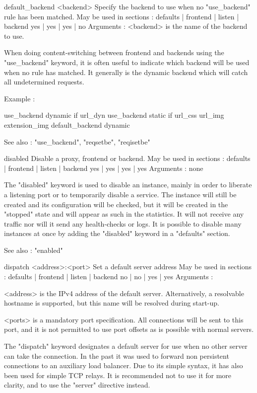 default_backend <backend>
  Specify the backend to use when no "use_backend" rule has been matched.
  May be used in sections :   defaults | frontend | listen | backend
                                 yes   |    yes   |   yes  |   no
  Arguments :
    <backend> is the name of the backend to use.

  When doing content-switching between frontend and backends using the
  "use_backend" keyword, it is often useful to indicate which backend will be
  used when no rule has matched. It generally is the dynamic backend which
  will catch all undetermined requests.

  Example :

        use_backend     dynamic  if  url_dyn
        use_backend     static   if  url_css url_img extension_img
        default_backend dynamic

  See also : "use_backend", "reqsetbe", "reqisetbe"


disabled
  Disable a proxy, frontend or backend.
  May be used in sections :   defaults | frontend | listen | backend
                                 yes   |    yes   |   yes  |   yes
  Arguments : none

  The "disabled" keyword is used to disable an instance, mainly in order to
  liberate a listening port or to temporarily disable a service. The instance
  will still be created and its configuration will be checked, but it will be
  created in the "stopped" state and will appear as such in the statistics. It
  will not receive any traffic nor will it send any health-checks or logs. It
  is possible to disable many instances at once by adding the "disabled"
  keyword in a "defaults" section.

  See also : "enabled"


dispatch <address>:<port>
  Set a default server address
  May be used in sections :   defaults | frontend | listen | backend
                                 no    |    no    |   yes  |   yes
  Arguments :

    <address> is the IPv4 address of the default server. Alternatively, a
              resolvable hostname is supported, but this name will be resolved
              during start-up.

    <ports>   is a mandatory port specification. All connections will be sent
              to this port, and it is not permitted to use port offsets as is
              possible with normal servers.

  The "dispatch" keyword designates a default server for use when no other
  server can take the connection. In the past it was used to forward non
  persistent connections to an auxiliary load balancer. Due to its simple
  syntax, it has also been used for simple TCP relays. It is recommended not to
  use it for more clarity, and to use the "server" directive instead.

